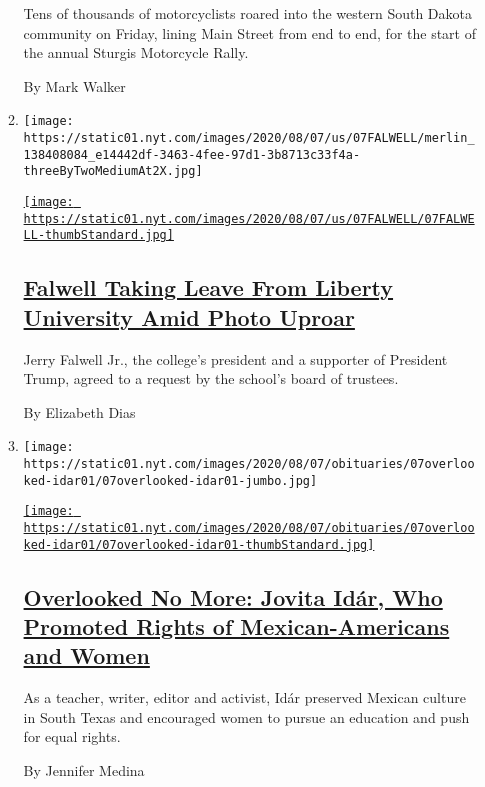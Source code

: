 \begin{enumerate}
\begin{enumerate}
    Tens of thousands of motorcyclists roared into the western South
    Dakota community on Friday, lining Main Street from end to end, for
    the start of the annual Sturgis Motorcycle Rally.

    By Mark Walker
  \item
    \texttt{[image: https://static01.nyt.com/images/2020/08/07/us/07FALWELL/merlin\_138408084\_e14442df-3463-4fee-97d1-3b8713c33f4a-threeByTwoMediumAt2X.jpg]}

    \href{/2020/08/07/us/falwell-liberty.html}{\texttt{[image: https://static01.nyt.com/images/2020/08/07/us/07FALWELL/07FALWELL-thumbStandard.jpg]}}

    \hypertarget{falwell-taking-leave-from-liberty-university-amid-photo-uproar}{%
    \subsection{\texorpdfstring{\href{/2020/08/07/us/falwell-liberty.html}{Falwell
    Taking Leave From Liberty University Amid Photo
    Uproar}}{Falwell Taking Leave From Liberty University Amid Photo Uproar}}\label{falwell-taking-leave-from-liberty-university-amid-photo-uproar}}

    Jerry Falwell Jr., the college's president and a supporter of
    President Trump, agreed to a request by the school's board of
    trustees.

    By Elizabeth Dias
  \item
    \texttt{[image: https://static01.nyt.com/images/2020/08/07/obituaries/07overlooked-idar01/07overlooked-idar01-jumbo.jpg]}

    \href{/2020/08/07/obituaries/jovita-idar-overlooked.html}{\texttt{[image: https://static01.nyt.com/images/2020/08/07/obituaries/07overlooked-idar01/07overlooked-idar01-thumbStandard.jpg]}}

    \hypertarget{overlooked-no-more-jovita-iduxe1r-who-promoted-rights-of-mexican-americans-and-women}{%
    \subsection{\texorpdfstring{\href{/2020/08/07/obituaries/jovita-idar-overlooked.html}{Overlooked
    No More: Jovita Idár, Who Promoted Rights of Mexican-Americans and
    Women}}{Overlooked No More: Jovita Idár, Who Promoted Rights of Mexican-Americans and Women}}\label{overlooked-no-more-jovita-iduxe1r-who-promoted-rights-of-mexican-americans-and-women}}

    As a teacher, writer, editor and activist, Idár preserved Mexican
    culture in South Texas and encouraged women to pursue an education
    and push for equal rights.

    By Jennifer Medina
  \end{enumerate}
\end{enumerate}


